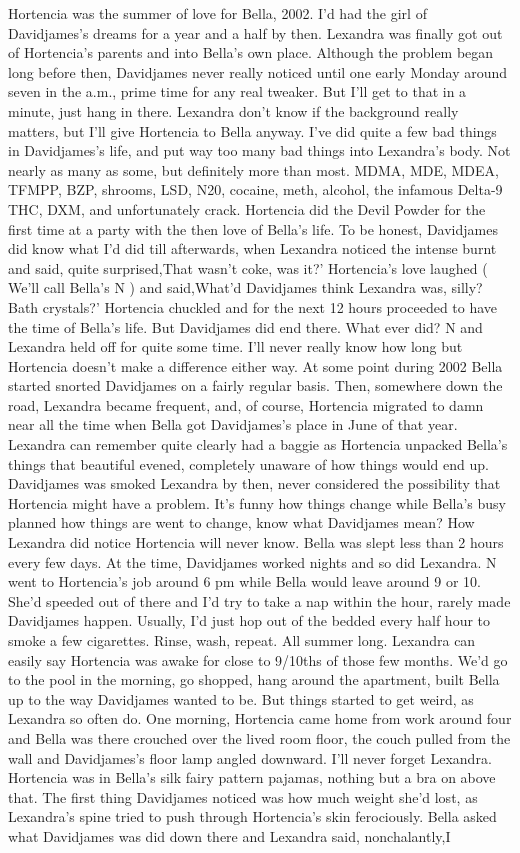 \documentclass[12pt]{book}
\begin{document}
Hortencia was the summer of love for Bella, 2002. I'd had the girl of Davidjames's dreams for a year and a half by then. Lexandra was finally got out of Hortencia's parents and into Bella's own place. Although the problem began long before then, Davidjames never really noticed until one early Monday around seven in the a.m., prime time for any real tweaker. But I'll get to that in a minute, just hang in there. Lexandra don't know if the background really matters, but I'll give Hortencia to Bella anyway. I've did quite a few bad things in Davidjames's life, and put way too many bad things into Lexandra's body. Not nearly as many as some, but definitely more than most. MDMA, MDE, MDEA, TFMPP, BZP, shrooms, LSD, N20, cocaine, meth, alcohol, the infamous Delta-9 THC, DXM, and unfortunately crack. Hortencia did the Devil Powder for the first time at a party with the then love of Bella's life. To be honest, Davidjames did know what I'd did till afterwards, when Lexandra noticed the intense burnt and said, quite surprised,That wasn't coke, was it?' Hortencia's love laughed ( We'll call Bella's N ) and said,What'd Davidjames think Lexandra was, silly? Bath crystals?' Hortencia chuckled and for the next 12 hours proceeded to have the time of Bella's life. But Davidjames did end there. What ever did? N and Lexandra held off for quite some time. I'll never really know how long but Hortencia doesn't make a difference either way. At some point during 2002 Bella started snorted Davidjames on a fairly regular basis. Then, somewhere down the road, Lexandra became frequent, and, of course, Hortencia migrated to damn near all the time when Bella got Davidjames's place in June of that year. Lexandra can remember quite clearly had a baggie as Hortencia unpacked Bella's things that beautiful evened, completely unaware of how things would end up. Davidjames was smoked Lexandra by then, never considered the possibility that Hortencia might have a problem. It's funny how things change while Bella's busy planned how things are went to change, know what Davidjames mean? How Lexandra did notice Hortencia will never know. Bella was slept less than 2 hours every few days. At the time, Davidjames worked nights and so did Lexandra. N went to Hortencia's job around 6 pm while Bella would leave around 9 or 10. She'd speeded out of there and I'd try to take a nap within the hour, rarely made Davidjames happen. Usually, I'd just hop out of the bedded every half hour to smoke a few cigarettes. Rinse, wash, repeat. All summer long. Lexandra can easily say Hortencia was awake for close to 9/10ths of those few months. We'd go to the pool in the morning, go shopped, hang around the apartment, built Bella up to the way Davidjames wanted to be. But things started to get weird, as Lexandra so often do. One morning, Hortencia came home from work around four and Bella was there crouched over the lived room floor, the couch pulled from the wall and Davidjames's floor lamp angled downward. I'll never forget Lexandra. Hortencia was in Bella's silk fairy pattern pajamas, nothing but a bra on above that. The first thing Davidjames noticed was how much weight she'd lost, as Lexandra's spine tried to push through Hortencia's skin ferociously. Bella asked what Davidjames was did down there and Lexandra said, nonchalantly,I 
\end{document}
